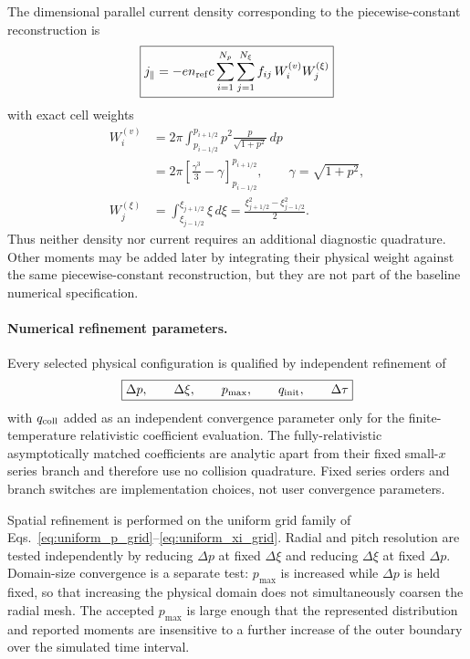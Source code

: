 \documentclass[11pt]{article}
\begin{document}
The dimensional parallel current density corresponding to the piecewise-constant
reconstruction is
\begin{equation}
 \boxed{
 j_\parallel
 =-e n_{\rm ref}c
 \sum_{i=1}^{N_p}\sum_{j=1}^{N_\xi}
 f_{ij}\,W_i^{(v)}W_j^{(\xi)}
 }
 \label{eq:discrete_current}
\end{equation}
with exact cell weights
\begin{align}
 W_i^{(v)}
 &=2\pi\int_{p_{i-1/2}}^{p_{i+1/2}}
       p^2\frac{p}{\sqrt{1+p^2}}\,dp
 \nonumber\\
 &=2\pi\left[
       \frac{\gamma^3}{3}-\gamma
       \right]_{p_{i-1/2}}^{p_{i+1/2}},
 \qquad \gamma=\sqrt{1+p^2},
 \label{eq:current_radial_weight}\\
 W_j^{(\xi)}
 &=\int_{\xi_{j-1/2}}^{\xi_{j+1/2}}\xi\,d\xi
 =\frac{\xi_{j+1/2}^2-\xi_{j-1/2}^2}{2}.
 \label{eq:current_pitch_weight}
\end{align}
Thus neither density nor current requires an additional diagnostic quadrature.  Other
moments may be added later by integrating their physical weight against the same
piecewise-constant reconstruction, but they are not part of the baseline numerical
specification.

\paragraph{Numerical refinement parameters.}
Every selected physical configuration is qualified by independent refinement of
\begin{equation}
 \boxed{
 \Delta p,\qquad \Delta\xi,\qquad p_{\max},\qquad
 q_{\rm init},\qquad \Delta\tau
 }
 \label{eq:convergence_parameters}
\end{equation}
with $q_{\rm coll}$ added as an independent convergence parameter only for the
finite-temperature relativistic coefficient evaluation.  The fully-relativistic asymptotically matched coefficients are analytic apart
from their fixed small-$x$ series branch and therefore
use no collision quadrature.  Fixed series orders and branch switches are implementation
choices, not user convergence parameters.

Spatial refinement is performed on the uniform grid family of
Eqs.~\eqref{eq:uniform_p_grid}--\eqref{eq:uniform_xi_grid}.  Radial and pitch resolution
are tested independently by reducing $\Delta p$ at fixed $\Delta\xi$ and reducing
$\Delta\xi$ at fixed $\Delta p$.  Domain-size convergence is a separate test:
$p_{\max}$ is increased while $\Delta p$ is held fixed, so that increasing the physical
domain does not simultaneously coarsen the radial mesh.  The accepted $p_{\max}$ is
large enough that the represented distribution and reported moments are insensitive to
a further increase of the outer boundary over the simulated time interval.
\end{document}

